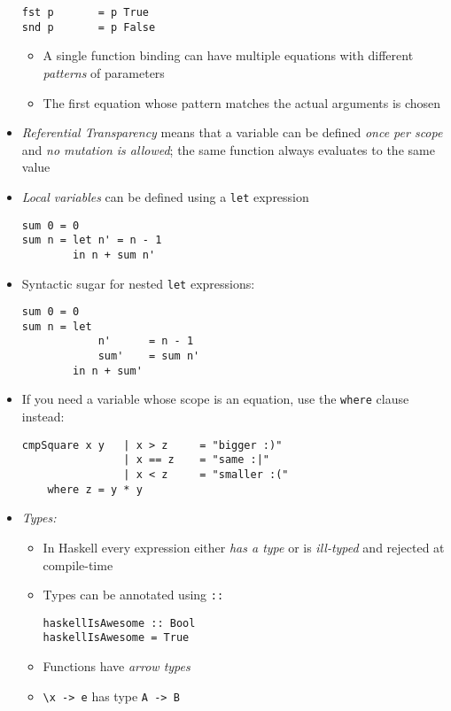 \documentclass[landscape,8pt]{extarticle}
\newcommand{\code}{\lstinline}
\begin{document}
\begin{multicols}{4}
\begin{itemize}
\begin{lstlisting}
fst p       = p True
snd p       = p False
\end{lstlisting}
              \begin{itemize}
                  \item A single function binding can have multiple equations with different \emph{patterns} of parameters
                  \item The first equation whose pattern matches the actual arguments is chosen
              \end{itemize}
        \item \emph{Referential Transparency} means that a variable can be defined \emph{once per scope} and \emph{no mutation is allowed}; the same function always evaluates to the same value
        \item \emph{Local variables} can be defined using a \code{let} expression
              \begin{lstlisting}
sum 0 = 0
sum n = let n' = n - 1
        in n + sum n'
           \end{lstlisting}
        \item Syntactic sugar for nested \code{let} expressions:
              \begin{lstlisting}
sum 0 = 0
sum n = let
            n'      = n - 1
            sum'    = sum n'
        in n + sum'
           \end{lstlisting}
        \item If you need a variable whose scope is an equation, use the \code{where} clause instead:
              \begin{lstlisting}
cmpSquare x y   | x > z     = "bigger :)"
                | x == z    = "same :|"
                | x < z     = "smaller :("
    where z = y * y
           \end{lstlisting}
        \item \emph{Types:}
              \begin{itemize}
                  \item In Haskell every expression either \emph{has a type} or is \emph{ill-typed} and rejected at compile-time
                  \item Types can be annotated using \code{::}
                        \begin{lstlisting}
haskellIsAwesome :: Bool
haskellIsAwesome = True
               \end{lstlisting}
                  \item Functions have \emph{arrow types}
                  \item \code{\x -> e} has type \code{A -> B}

\end{itemize}
\end{itemize}
\end{multicols}
\end{document}
